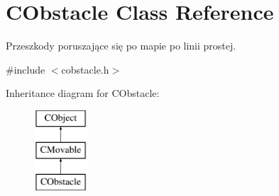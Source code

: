 \hypertarget{class_c_obstacle}{}\section{C\+Obstacle Class Reference}
\label{class_c_obstacle}


Przeszkody poruszające się po mapie po linii prostej.  




{\ttfamily \#include $<$cobstacle.\+h$>$}

Inheritance diagram for C\+Obstacle\+:\begin{figure}[H]
\begin{center}
\leavevmode
\includegraphics[height=3.000000cm]{class_c_obstacle}
\end{center}
\end{figure}
